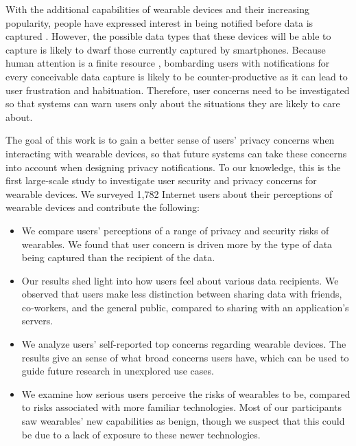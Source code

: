 With the additional capabilities of wearable devices and their increasing popularity, people have expressed interest in being notified before data is captured \cite{denning2014situ}. However, the possible data types that these devices will be able to capture is likely to dwarf those currently captured by smartphones. Because human attention is a finite resource \cite{bohme2011security}, bombarding users with notifications for every conceivable data capture is likely to be counter-productive as it can lead to user frustration and habituation. Therefore, user concerns need to be investigated so that systems can warn users only about the situations they are likely to care about.

The goal of this work is to gain a better sense of users' privacy concerns when interacting with wearable devices, so that future systems can take these concerns into account when designing privacy notifications. To our knowledge, this is the first large-scale study to investigate user security and privacy concerns for wearable devices. We surveyed 1,782 Internet users about their perceptions of wearable devices and contribute the following: %

\begin{itemize} \itemsep1pt \parskip0pt 
\item We compare users' perceptions of a range of privacy and security risks of wearables. We found that user concern is driven more by the type of data being captured than the recipient of the data.
\item Our results shed light into how users feel about various data recipients. We observed that users make less distinction between sharing data with friends, co-workers, and the general public, compared to sharing with an application's servers.
\item We analyze users' self-reported top concerns regarding wearable devices. The results give an sense of what broad concerns users have, which can be used to guide future research in unexplored use cases. 
\item We examine how serious users perceive the risks of wearables to be, compared to risks associated with more familiar technologies. Most of our participants saw wearables' new capabilities as benign, though we suspect that this could be due to a lack of exposure to these newer technologies.
\end{itemize}
